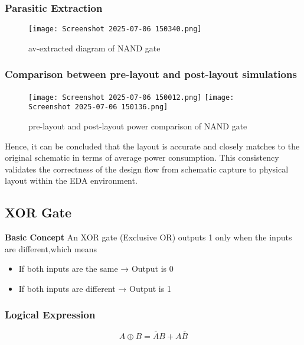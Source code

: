 \documentclass[12pt]{article}
\begin{document}
    \subsubsection{Parasitic Extraction}
        \begin{figure}[H]
            \centering
            \texttt{[image: Screenshot 2025-07-06 150340.png]}
            \caption{av-extracted diagram of NAND gate}
            \label{fig:enter-label}
        \end{figure}

    \subsubsection{Comparison between pre-layout and post-layout simulations}
      \begin{figure}[H]
          \centering
          \texttt{[image: Screenshot 2025-07-06 150012.png]}
          \texttt{[image: Screenshot 2025-07-06 150136.png]}
          \caption{pre-layout and post-layout power comparison of NAND gate}
          \label{fig:enter-label}
      \end{figure}
       Hence, it can be concluded that the layout is accurate and closely matches to the original schematic in terms of average power consumption. This consistency validates the correctness of the design flow from schematic capture to physical layout within the EDA environment.


  

  \subsection{\large{\textbf{XOR Gate}}}
     \textbf{Basic Concept}
         An XOR gate (Exclusive OR) outputs 1 only when the inputs are different,which means
    \begin{itemize}
        \item If both inputs are the same → Output is 0
         \item If both inputs are different → Output is 1
         
     \end{itemize}
     \subsubsection{Logical Expression}
        \[
        A \oplus B = \overline{A}B + A\overline{B}
        \]
\end{document}
